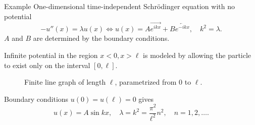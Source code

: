 \documentclass{beamer}
\begin{document}

  \begin{frame}{Example}
    One-dimensional time-independent Schrödinger equation with no potential
    \[
      -u''(x) = \lambda u(x) \iff u(x) = A \overrightarrow{e^{ikx}} + B \overleftarrow{e^{-ikx}}, \quad k^2 = \lambda.
    \]
    $A$ and $B$ are determined by the boundary conditions.
    \pause
    \begin{example}
      Infinite potential in the region $x<0, x>\ell$ is modeled by allowing the particle to exist only on the interval $[0,\ell]$.
      \vspace{-0.2em}
      \begin{figure}
        \centering
        \vspace{-1em}
        \caption{Finite line graph of length $\ell$, parametrized from $0$ to $\ell$.}
      \end{figure}
      \vspace{-1em}Boundary conditions $u(0)=u(\ell)=0$ gives
      \vspace{-0.5em}
      \[ u(x) = A \sin kx, \quad \lambda = k^2 = \frac{\pi^2}{\ell^2}n^2, \quad n=1,2,\ldots. \]
    \end{example}
  \end{frame}
\end{document}
